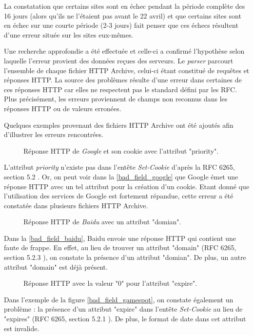 La constatation que certains sites sont en échec pendant la période complète des 16 jours (alors qu'ils ne l'étaient pas avant le 22 avril) et que certains sites sont en échec sur une courte période (2-3 jours) fait penser que ces échecs résultent d'une erreur située sur les sites eux-mêmes.

Une recherche approfondie a été effectuée et celle-ci a confirmé l'hypothèse selon laquelle l'erreur provient des données reçues des serveurs. Le \textit{parser} parcourt l'ensemble de chaque fichier HTTP Archive, celui-ci étant constitué de requêtes et réponses HTTP. La source des problèmes résulte d'une erreur dans certaines de ces réponses HTTP car elles ne respectent pas le standard défini par les RFC. Plus précisément, les erreurs proviennent de champs non reconnus dans les réponses HTTP ou de valeurs erronées.

Quelques exemples provenant des fichiers HTTP Archive ont été ajoutés afin d'illustrer les erreurs rencontrées.

\begin{figure}[h]
	\centering
	
	\caption{\label{bad_field_google}Réponse HTTP de \textit{Google} et son cookie avec l'attribut "priority".}
\end{figure}
L'attribut \textit{priority} n'existe pas dans l'entête \textit{Set-Cookie} d'après la RFC 6265, section 5.2 \cite{IETF_RFC6265}. Or, on peut voir dans la \autoref{bad_field_google} que Google émet une réponse HTTP avec un tel attribut pour la création d'un cookie. Etant donné que l'utilisation des services de Google est fortement répandue, cette erreur a été constatée dans plusieurs fichiers HTTP Archive.

\begin{figure}[h]
	\centering
	
	\caption{\label{bad_field_baidu}Réponse HTTP de \textit{Baidu} avec un attribut "domian".}
\end{figure}
Dans la \autoref{bad_field_baidu}, Baidu envoie une réponse HTTP qui contient une faute de frappe. En effet, au lieu de trouver un attribut "domain" (RFC 6265, section 5.2.3 \cite{IETF_RFC6265}), on constate la présence d'un attribut "domian". De plus, un autre attribut "domain" est déjà présent.

\begin{figure}[h]
	\centering
	
	\caption{\label{bad_field_gamespot}Réponse HTTP avec la valeur "0" pour l'attribut "expire".}
\end{figure}
Dans l'exemple de la figure \autoref{bad_field_gamespot}, on constate également un problème : la présence d'un attribut "expire" dans l'entête \textit{Set-Cookie} au lieu de "expires" (RFC 6265, section 5.2.1 \cite{IETF_RFC6265}). De plus, le format de date dans cet attribut est invalide.
\newline

